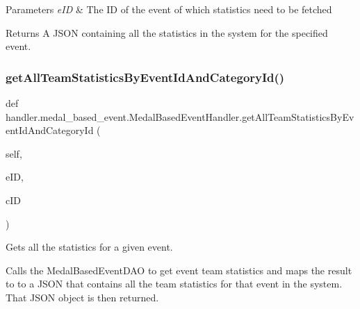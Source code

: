 \begin{DoxyParams}{Parameters}
{\em e\+ID} & The ID of the event of which statistics need to be fetched\\
\hline
\end{DoxyParams}
\begin{DoxyReturn}{Returns}
A J\+S\+ON containing all the statistics in the system for the specified event. 
\end{DoxyReturn}
\mbox{\label{classhandler_1_1medal__based__event_1_1_medal_based_event_handler_a1eee8b54acc90b9bdae7ce8729f50b4f}} 
\subsubsection{\texorpdfstring{get\+All\+Team\+Statistics\+By\+Event\+Id\+And\+Category\+Id()}{getAllTeamStatisticsByEventIdAndCategoryId()}}
{\footnotesize\ttfamily def handler.\+medal\+\_\+based\+\_\+event.\+Medal\+Based\+Event\+Handler.\+get\+All\+Team\+Statistics\+By\+Event\+Id\+And\+Category\+Id (\begin{DoxyParamCaption}\item[{}]{self,  }\item[{}]{e\+ID,  }\item[{}]{c\+ID }\end{DoxyParamCaption})}



Gets all the statistics for a given event. 

Calls the Medal\+Based\+Event\+D\+AO to get event team statistics and maps the result to to a J\+S\+ON that contains all the team statistics for that event in the system. That J\+S\+ON object is then returned.


